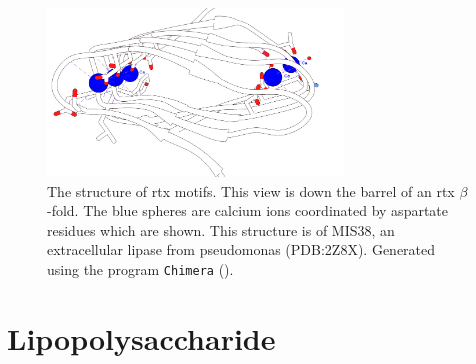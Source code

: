 \begin{figure}[htb]
  	\begin{center}
   		\includegraphics[width=0.7\textwidth]{intro/img/rtx-white.png}
   	\end{center}
   	\caption[The structure of \ac{rtx} motifs]{The structure of \ac{rtx} motifs. This view is down the barrel of an \ac{rtx} $\beta$-fold. The blue spheres are calcium ions coordinated by aspartate residues which are shown. This structure is of MIS38, an extracellular lipase from \ac{pseudomonas} (PDB:2Z8X). Generated using the program \texttt{Chimera} ().
   	}
   	\label{fig:intro-rtx}
\end{figure}   



\section{Lipopolysaccharide}
\label{sec:intro-lps}
    
